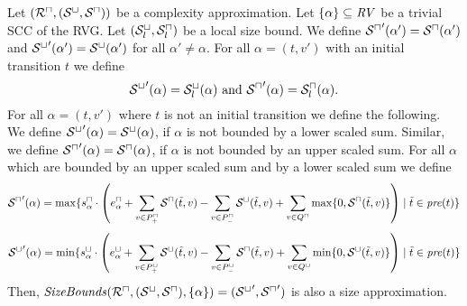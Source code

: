 \begin{theorem}
  Let $({\mathcal{R}^\sqcap}, {({\mathcal{S}^\sqcup}, {\mathcal{S}^\sqcap})})$ be a complexity approximation.
  Let $\lbrace \alpha \rbrace \subseteq \mathit{RV}$ be a trivial SCC of the RVG.
  Let ${({\mathcal{S}^\sqcup_l}, {\mathcal{S}^\sqcap_l})}$ be a local size bound.
  We define ${\mathcal{S}^\sqcap}'(\alpha') = {\mathcal{S}^\sqcap}(\alpha')$ and ${\mathcal{S}^\sqcup}'(\alpha') = {\mathcal{S}^\sqcup}(\alpha')$ for all $\alpha' \neq \alpha$.
  For all $\alpha = (t, v')$ with an initial transition $t$ we define
  \[ {\mathcal{S}^\sqcup}'(\alpha) = {\mathcal{S}^\sqcup_l}(\alpha) \text{ and } {\mathcal{S}^\sqcap}'(\alpha) = {\mathcal{S}^\sqcap_l}(\alpha). \]
  For all $\alpha = (t, v')$ where $t$ is not an initial transition we define the following.
  We define ${\mathcal{S}^\sqcup}'(\alpha) = {\mathcal{S}^\sqcup}(\alpha)$, if $\alpha$ is not bounded by a lower scaled sum.
  Similar, we define ${\mathcal{S}^\sqcap}'(\alpha) = {\mathcal{S}^\sqcap}(\alpha)$, if $\alpha$ is not bounded by an upper scaled sum.
  For all $\alpha$ which are bounded by an upper scaled sum and by a lower scaled sum we define 
  \[ {\mathcal{S}^\sqcap}'(\alpha) = \max \lbrace  s^\sqcap_\alpha \cdot \left( e^\sqcap_\alpha + \sum_{v \in P_+^\sqcap} {\mathcal{S}^\sqcap}(\tilde{t}, v) - \sum_{v \in P_-^\sqcap} {\mathcal{S}^\sqcup}(\tilde{t}, v) + \sum_{v \in Q^\sqcap} \max \lbrace 0,{\mathcal{S}^\sqcap}(\tilde{t}, v) \rbrace \right) \mid \tilde{t} \in \mathit{pre}(t) \rbrace \]
  \[ {\mathcal{S}^\sqcup}'(\alpha) = \min \lbrace  s^\sqcup_\alpha \cdot \left( e^\sqcup_\alpha + \sum_{v \in P_+^\sqcup} {\mathcal{S}^\sqcup}(\tilde{t}, v) - \sum_{v \in P_-^\sqcup} {\mathcal{S}^\sqcap}(\tilde{t}, v) + \sum_{v \in Q^\sqcup} \min \lbrace 0,{\mathcal{S}^\sqcup}(\tilde{t}, v) \rbrace \right) \mid \tilde{t} \in \mathit{pre}(t) \rbrace \]
  Then, $\mathit{SizeBounds}({\mathcal{R}^\sqcap}, {({\mathcal{S}^\sqcup}, {\mathcal{S}^\sqcap})}, \lbrace \alpha \rbrace) = ({\mathcal{S}^\sqcup}', {\mathcal{S}^\sqcap}')$ is also a size approximation.
\end{theorem}
